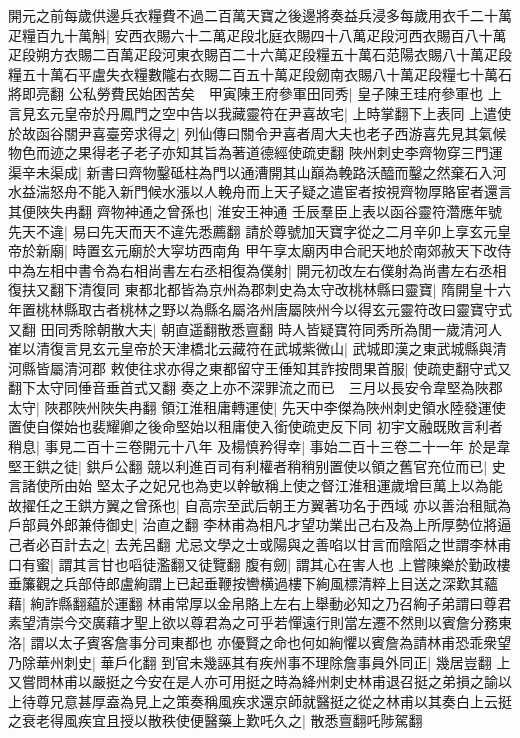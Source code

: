 開元之前每歲供邊兵衣糧費不過二百萬天寶之後邊將奏益兵浸多每歲用衣千二十萬疋糧百九十萬斛|{
	安西衣賜六十二萬疋段北庭衣賜四十八萬疋段河西衣賜百八十萬疋段朔方衣賜二百萬疋段河東衣賜百二十六萬疋段糧五十萬石范陽衣賜八十萬疋段糧五十萬石平盧失衣糧數隴右衣賜二百五十萬疋段劒南衣賜八十萬疋段糧七十萬石將即亮翻}
公私勞費民始困苦矣　甲寅陳王府參軍田同秀|{
	皇子陳王珪府參軍也}
上言見玄元皇帝於丹鳳門之空中告以我藏靈符在尹喜故宅|{
	上時掌翻下上表同}
上遣使於故函谷關尹喜臺旁求得之|{
	列仙傳曰關令尹喜者周大夫也老子西游喜先見其氣候物色而迹之果得老子老子亦知其旨為著道德經使疏吏翻}
陜州刺史李齊物穿三門運渠辛未渠成|{
	新書曰齊物鑿砥柱為門以通漕開其山巔為輓路沃醯而鑿之然棄石入河水益湍怒舟不能入新門候水漲以人輓舟而上天子疑之遣宦者按視齊物厚賂宦者還言其便陜失冉翻}
齊物神通之曾孫也|{
	淮安王神通}
壬辰羣臣上表以函谷靈符濳應年號先天不違|{
	易曰先天而天不違先悉薦翻}
請於尊號加天寶字從之二月辛卯上享玄元皇帝於新廟|{
	時置玄元廟於大寜坊西南角}
甲午享太廟丙申合祀天地於南郊赦天下改侍中為左相中書令為右相尚書左右丞相復為僕射|{
	開元初改左右僕射為尚書左右丞相復扶又翻下清復同}
東都北都皆為京州為郡刺史為太守改桃林縣曰靈寶|{
	隋開皇十六年置桃林縣取古者桃林之野以為縣名屬洛州唐屬陜州今以得玄元靈符改曰靈寶守式又翻}
田同秀除朝散大夫|{
	朝直遥翻散悉亶翻}
時人皆疑寶符同秀所為閒一歲清河人崔以清復言見玄元皇帝於天津橋北云藏符在武城紫微山|{
	武城即漢之東武城縣與清河縣皆屬清河郡}
敕使往求亦得之東都留守王倕知其詐按問果首服|{
	使疏吏翻守式又翻下太守同倕音垂首式又翻}
奏之上亦不深罪流之而已　三月以長安令韋堅為陜郡太守|{
	陜郡陜州陜失冉翻}
領江淮租庸轉運使|{
	先天中李傑為陜州刺史領水陸發運使置使自傑始也裴耀卿之後命堅始以租庸使入銜使疏吏反下同}
初宇文融既敗言利者稍息|{
	事見二百十三卷開元十八年}
及楊慎矜得幸|{
	事始二百十三卷二十一年}
於是韋堅王鉷之徒|{
	鉷戶公翻}
競以利進百司有利權者稍稍别置使以領之舊官充位而已|{
	史言諸使所由始}
堅太子之妃兄也為吏以幹敏稱上使之督江淮租運歲增巨萬上以為能故擢任之王鉷方翼之曾孫也|{
	自高宗至武后朝王方翼著功名于西域}
亦以善治租賦為戶部員外郎兼侍御史|{
	治直之翻}
李林甫為相凡才望功業出己右及為上所厚勢位將逼己者必百計去之|{
	去羌呂翻}
尤忌文學之士或陽與之善啗以甘言而陰䧟之世謂李林甫口有蜜|{
	謂其言甘也㗖徒濫翻又徒覽翻}
腹有劒|{
	謂其心在害人也}
上嘗陳樂於勤政樓垂簾觀之兵部侍郎盧絢謂上已起垂鞭按轡横過樓下絢風標清粹上目送之深歎其蘊藉|{
	絢詐縣翻藴於運翻}
林甫常厚以金帛賂上左右上舉動必知之乃召絢子弟謂曰尊君素望清崇今交廣藉才聖上欲以尊君為之可乎若憚遠行則當左遷不然則以賓詹分務東洛|{
	謂以太子賓客詹事分司東都也}
亦優賢之命也何如絢懼以賓詹為請林甫恐乖衆望乃除華州刺史|{
	華戶化翻}
到官未幾誣其有疾州事不理除詹事員外同正|{
	幾居豈翻}
上又嘗問林甫以嚴挺之今安在是人亦可用挺之時為絳州刺史林甫退召挺之弟損之諭以上待尊兄意甚厚盍為見上之策奏稱風疾求還京師就醫挺之從之林甫以其奏白上云挺之衰老得風疾宜且授以散秩使便醫藥上歎吒久之|{
	散悉亶翻吒陟駕翻}
